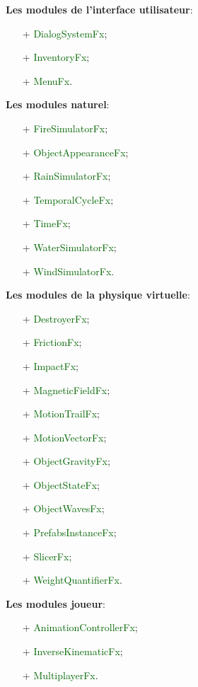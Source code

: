 \documentclass[ebook, 8pt, oneside, openany]{memoir}
\begin{document}
	\textbf{Les modules de l'interface utilisateur}:
	\begin{itemize}
		\item[+] \textcolor{darkgreen}{DialogSystemFx};
		\item[+] \textcolor{darkgreen}{InventoryFx};
		\item[+] \textcolor{darkgreen}{MenuFx}.
	\end{itemize}
	\textbf{Les modules naturel}:
	\begin{itemize}
		\item[+] \textcolor{darkgreen}{FireSimulatorFx};
		\item[+] \textcolor{darkgreen}{ObjectAppearanceFx};
		\item[+] \textcolor{darkgreen}{RainSimulatorFx};
		\item[+] \textcolor{darkgreen}{TemporalCycleFx};
		\item[+] \textcolor{darkgreen}{TimeFx};
		\item[+] \textcolor{darkgreen}{WaterSimulatorFx};
		\item[+] \textcolor{darkgreen}{WindSimulatorFx}.
	\end{itemize}
	\textbf{Les modules de la physique virtuelle}:
	\begin{itemize}
		\item[+] \textcolor{darkgreen}{DestroyerFx};
		\item[+] \textcolor{darkgreen}{FrictionFx};
		\item[+] \textcolor{darkgreen}{ImpactFx};
		\item[+] \textcolor{darkgreen}{MagneticFieldFx};
		\item[+] \textcolor{darkgreen}{MotionTrailFx};
		\item[+] \textcolor{darkgreen}{MotionVectorFx};
		\item[+] \textcolor{darkgreen}{ObjectGravityFx};
		\item[+] \textcolor{darkgreen}{ObjectStateFx};
		\item[+] \textcolor{darkgreen}{ObjectWavesFx};
		\item[+] \textcolor{darkgreen}{PrefabsInstanceFx};
		\item[+] \textcolor{darkgreen}{SlicerFx};
		\item[+] \textcolor{darkgreen}{WeightQuantifierFx}.
	\end{itemize}
	\textbf{Les modules joueur}:
	\begin{itemize}
		\item[+] \textcolor{darkgreen}{AnimationControllerFx};
		\item[+] \textcolor{darkgreen}{InverseKinematicFx};
		\item[+] \textcolor{darkgreen}{MultiplayerFx}.
	\end{itemize}
\end{document}
